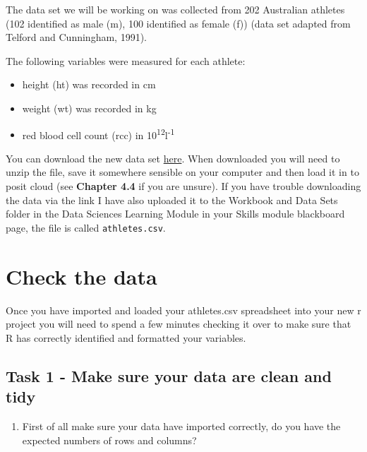 \documentclass[
]{book}
\providecommand{\tightlist}{%
  \setlength{\itemsep}{0pt}\setlength{\parskip}{0pt}}
\begin{document}
The data set we will be working on was collected from 202 Australian athletes (102 identified as male (m), 100 identified as female (f)) (data set adapted from Telford and Cunningham, 1991).

The following variables were measured for each athlete:

\begin{itemize}
\tightlist
\item
  height (ht) was recorded in cm
\item
  weight (wt) was recorded in kg
\item
  red blood cell count (rcc) in 10\textsuperscript{12}l\textsuperscript{-1}
\end{itemize}

You can download the new data set \href{https://downgit.github.io/\#/home?url=https://github.com/ellenbell/4008Y/blob/main/data/athletes.csv}{here}. When downloaded you will need to unzip the file, save it somewhere sensible on your computer and then load it in to posit cloud (see \textbf{Chapter 4.4} if you are unsure). If you have trouble downloading the data via the link I have also uploaded it to the Workbook and Data Sets folder in the Data Sciences Learning Module in your Skills module blackboard page, the file is called \texttt{athletes.csv}.

\hypertarget{check-the-data}{%
\section{Check the data}\label{check-the-data}}

Once you have imported and loaded your athletes.csv spreadsheet into your new r project you will need to spend a few minutes checking it over to make sure that R has correctly identified and formatted your variables.

\hypertarget{task-1---make-sure-your-data-are-clean-and-tidy}{%
\subsection{Task 1 - Make sure your data are clean and tidy}\label{task-1---make-sure-your-data-are-clean-and-tidy}}

\begin{enumerate}
\def\labelenumi{\arabic{enumi})}
\tightlist
\item
  First of all make sure your data have imported correctly, do you have the expected numbers of rows and columns?
\end{enumerate}
\end{document}
